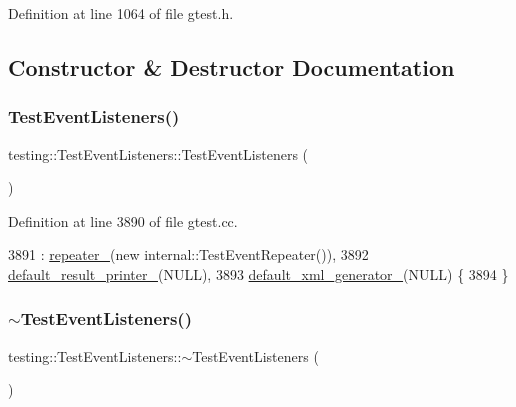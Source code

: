 Definition at line 1064 of file gtest.\+h.



\subsection{Constructor \& Destructor Documentation}
\mbox{\label{classtesting_1_1TestEventListeners_af0716e4067a6f357ee5ea18802a591dd}} 
\subsubsection{\texorpdfstring{Test\+Event\+Listeners()}{TestEventListeners()}}
{\footnotesize\ttfamily testing\+::\+Test\+Event\+Listeners\+::\+Test\+Event\+Listeners (\begin{DoxyParamCaption}{ }\end{DoxyParamCaption})}



Definition at line 3890 of file gtest.\+cc.


\begin{DoxyCode}
3891     : \hyperlink{classtesting_1_1TestEventListeners_a625d58b951893e80cde12862aece6fd8}{repeater\_}(\textcolor{keyword}{new} internal::TestEventRepeater()),
3892       \hyperlink{classtesting_1_1TestEventListeners_a9ff9ebc31a9a52e5f108661cfcb7ecd9}{default\_result\_printer\_}(NULL),
3893       \hyperlink{classtesting_1_1TestEventListeners_a018a3952aa10c19251b88f27abe373d3}{default\_xml\_generator\_}(NULL) \{
3894 \}
\end{DoxyCode}
\mbox{\label{classtesting_1_1TestEventListeners_abe9fbbbedf7f55fa898abfae60aa4913}} 
\subsubsection{\texorpdfstring{$\sim$\+Test\+Event\+Listeners()}{~TestEventListeners()}}
{\footnotesize\ttfamily testing\+::\+Test\+Event\+Listeners\+::$\sim$\+Test\+Event\+Listeners (\begin{DoxyParamCaption}{ }\end{DoxyParamCaption})}



